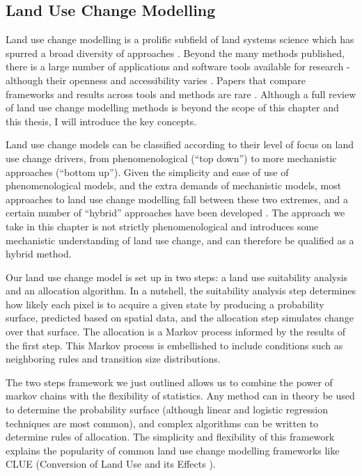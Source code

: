 \subsection{Land Use Change Modelling}
Land use change modelling is a prolific subfield of land systems science which has spurred a broad diversity of approaches \citep{dang_review_2016, noszczyk_review_2018}. Beyond the many methods published, there is a large number of applications and software tools available for research - although their openness and accessibility varies \citep{moulds_open_2015}. Papers that compare frameworks and results across tools and methods are rare \citep{pontius_comparing_2008, pontius_comparison_2005, sun_comparison_2018}. Although a full review of land use change modelling methods is beyond the scope of this chapter and this thesis, I will introduce the key concepts.

Land use change models can be classified according to their level of focus on land use change drivers, from phenomenological (“top down”) to more mechanistic approaches (“bottom up”). Given the simplicity and ease of use of phenomenological models, and the extra demands of mechanistic models, most approaches to land use change modelling fall between these two extremes, and a certain number of “hybrid” approaches have been developed \citep{sun_comparison_2018, jokar_arsanjani_integration_2013}. The approach we take in this chapter is not strictly phenomenological and introduces some mechanistic understanding of land use change, and can therefore be qualified as a hybrid method.

Our land use change model is set up in two steps: a land use suitability analysis and an allocation algorithm. In a nutshell, the suitability analysis step determines how likely each pixel is to acquire a given state by producing a probability surface, predicted based on spatial data, and the allocation step simulates change over that surface. The allocation is a Markov process informed by the results of the first step. This Markov process is embellished to include conditions such as neighboring rules and transition size distributions.

The two steps framework we just outlined allows us to combine the power of markov chains with the flexibility of statistics. Any method can in theory be used to determine the probability surface (although linear and logistic regression techniques are most common), and complex algorithms can be written to determine rules of allocation. The simplicity and flexibility of this framework explains the popularity of common land use change modelling frameworks like CLUE  (Conversion of Land Use and its Effects \cite{verburg_modeling_2002, verburg_combining_2009}). \\


